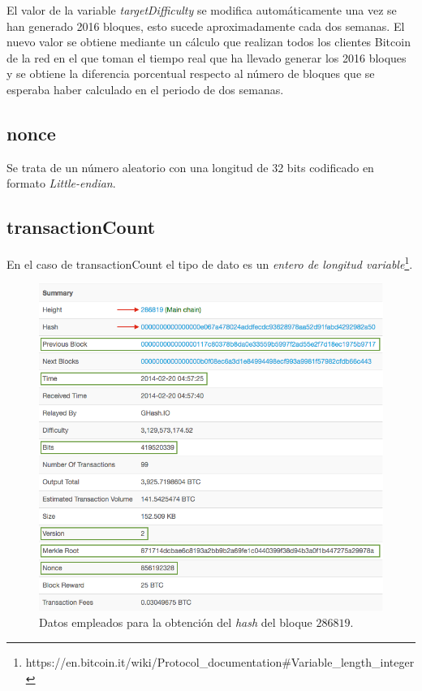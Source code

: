 \documentclass{article}
\begin{document}
    El valor de la variable \textit{targetDifficulty} se modifica automáticamente una vez se han generado 2016 bloques, esto sucede aproximadamente cada dos semanas. El nuevo valor se obtiene mediante un cálculo que realizan todos los clientes Bitcoin de la red en el que toman el tiempo real que ha llevado generar los 2016 bloques y se obtiene la diferencia porcentual respecto al número de bloques que se esperaba haber calculado en el periodo de dos semanas.
    
    \subsection{nonce}
    Se trata de un número aleatorio con una longitud de 32 bits codificado en formato \textit{Little-endian}.
    
    \subsection{transactionCount}
    En el caso de transactionCount el tipo de dato es un \textit{entero de longitud variable}\footnote{https://en.bitcoin.it/wiki/Protocol\_documentation\#Variable\_length\_integer}.
    
    \begin{figure}[H]
    \centering
        \includegraphics[scale=0.47]{img/Bitcoin_block_SHA_256_Block_Data}
        \caption{Datos empleados para la obtención del \textit{hash} del bloque $286819$.}
    \end{figure}
    
\end{document}

